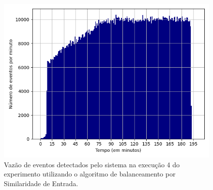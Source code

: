 


\begin{figure}[h]
\centering
\includegraphics[width=\textwidth]{figuras/graphics/histogram_vazao_9-dez-is.png}
\caption{Vazão de eventos detectados pelo sistema na execução 4 do experimento utilizando o algoritmo de balanceamento por Similaridade de Entrada.}
\label{fig:vazao_9-dez-is}
\end{figure}




